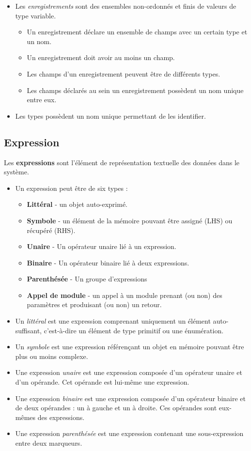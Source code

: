 \begin{itemize}
    \item Les \textit{enregistrements} sont des ensembles non-ordonnés et finis de valeurs de type variable.
        \begin{itemize}
            \item Un enregistrement déclare un ensemble de champs avec un certain type et un nom.
            \item Un enregistrement doit avoir au moins un champ.
            \item Les champs d'un enregistrement peuvent être de différents types.
            \item Les champs déclarés au sein un enregistrement possèdent un nom unique entre eux.
        \end{itemize}
    \item Les types possèdent un nom unique permettant de les identifier.
\end{itemize}


\subsection{Expression}
Les \textbf{expressions} sont l'élément de représentation textuelle des données dans le système.
\begin{itemize}
    \item Un expression peut être de six types :
        \begin{itemize}
            \item \textbf{Littéral} - un objet auto-exprimé.
            \item \textbf{Symbole} - un élément de la mémoire pouvant être assigné (LHS) ou récupéré (RHS).
            \item \textbf{Unaire} - Un opérateur unaire lié à un expression.
            \item \textbf{Binaire} - Un opérateur binaire lié à deux expressions.
            \item \textbf{Parenthésée} - Un groupe d'expressions
            \item \textbf{Appel de module} - un appel à un module prenant (ou non) des paramètres et produisant (ou non) un retour.
        \end{itemize}
    \item Un \textit{littéral} est une expression comprenant uniquement un élément auto-suffisant, c'est-à-dire un élément de type primitif ou une énumération.
    \item Un \textit{symbole} est une expression référençant un objet en mémoire pouvant être plus ou moins complexe.
    \item Une expression \textit{unaire} est une expression composée d'un opérateur unaire et d'un opérande. Cet opérande est lui-même une expression.
    \item Une expression \textit{binaire} est une expression composée d'un opérateur binaire et de deux opérandes : un à gauche et un à droite. Ces opérandes sont eux-mêmes des expressions.
    \item Une expression \textit{parenthésée} est une expression contenant une sous-expression entre deux marqueurs.
\end{itemize}

